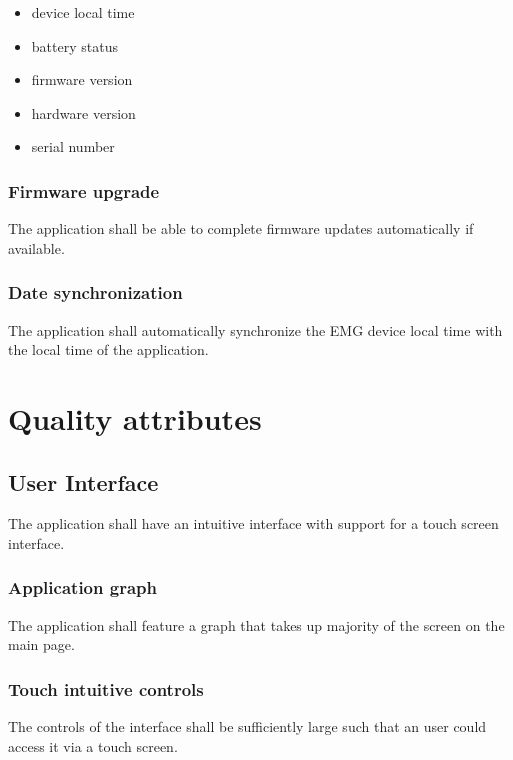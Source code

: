\documentclass[12pt,a4paper]{article}
\begin{document}
\begin{itemize}
\item device local time
\item battery status
\item firmware version
\item hardware version
\item serial number
\end{itemize}

\subsubsection{Firmware upgrade}

The application shall be able to complete firmware updates automatically if available.

\subsubsection{Date synchronization}

The application shall automatically synchronize the EMG device local time with the local time of the application.

\newpage

\section{Quality attributes}

\subsection{User Interface}

The application shall have an intuitive interface with support for a touch screen interface.

\subsubsection{Application graph}

The application shall feature a graph that takes up majority of the screen on the main page.

\subsubsection{Touch intuitive controls}

The controls of the interface shall be sufficiently large such that an user could access it via a touch screen.
\end{document}
